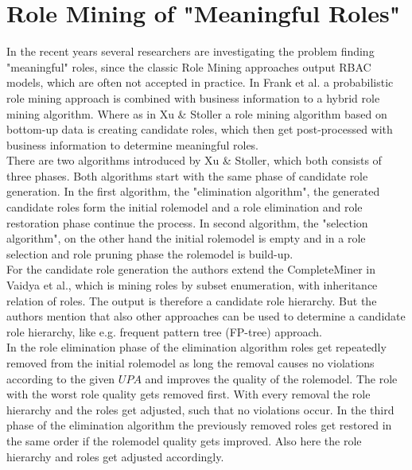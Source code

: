 \section{Role Mining of "Meaningful Roles"}
\label{sec:relatedWork2}
In the recent years several researchers are investigating the problem finding "meaningful" roles, since the classic Role Mining approaches output RBAC models, which are often not accepted in practice. In Frank et al.\cite{Frank} a probabilistic role mining approach is combined with business information to a hybrid role mining algorithm. Where as in Xu \& Stoller\cite{Xu} a role mining algorithm based on bottom-up data is creating candidate roles, which then get post-processed with business information to determine meaningful roles.\\
\newline
There are two algorithms introduced by Xu \& Stoller\cite{Xu}, which both consists of three phases. Both algorithms start with the same phase of candidate role generation. In the first algorithm, the "elimination algorithm", the generated candidate roles form the initial rolemodel and a role elimination and role restoration phase continue the process.  In second algorithm, the "selection algorithm", on the other hand the initial rolemodel is empty and in a role selection and role pruning phase the rolemodel is build-up.\\
For the candidate role generation the authors extend the CompleteMiner in Vaidya et al.\cite{Vaidya:2006:RMR:1180405.1180424}, which is mining roles by subset enumeration, with inheritance relation of roles. The output is therefore a candidate role hierarchy. But the authors mention that also other approaches can be used to determine a candidate role hierarchy, like e.g. frequent pattern tree (FP-tree) approach\cite{Han}.\\
In the role elimination phase of the elimination algorithm roles get repeatedly removed from the initial rolemodel as long the removal causes no violations according to the given $UPA$ and improves the quality of the rolemodel. The role with the worst role quality gets removed first. With every removal the role hierarchy and the roles get adjusted, such that no violations occur. In the third phase of the elimination algorithm the previously removed roles get restored in the same order if the rolemodel quality gets improved. Also here the role hierarchy and roles get adjusted accordingly.\\
